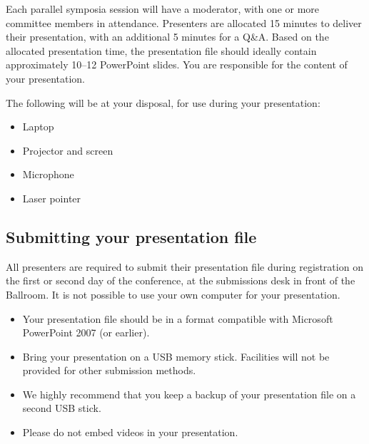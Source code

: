 \documentclass[12pt]{article}
\title{\Huge\scshape\textrmlf{Presentation guidelines}}
\author{}
\date{}
\begin{document}
\maketitle
\vspace{-5pc}
\raggedright
\thispagestyle{fancy}

Each parallel symposia session will have a moderator, with one or more committee members in attendance. Presenters are allocated 15 minutes to deliver their presentation, with an additional 5 minutes for a Q\&A. Based on the allocated presentation time, the presentation file should ideally contain approximately 10–12 PowerPoint slides. You are responsible for the content of your presentation.

The following will be at your disposal, for use during your presentation:

\begin{itemize}[itemsep=0mm,leftmargin=3.2mm]
  \item Laptop
  \item Projector and screen
  \item Microphone
  \item Laser pointer
\end{itemize}

\subsection*{Submitting your presentation file}

All presenters are required to submit their presentation file during registration on the first or second day of the conference, at the submissions desk in front of the Ballroom. It is not possible to use your own computer for your presentation.

\begin{itemize}[itemsep=0mm,leftmargin=3.2mm]
  \item Your presentation file should be in a format compatible with Microsoft PowerPoint 2007 (or earlier).
  \item Bring your presentation on a USB memory stick. Facilities will not be provided for other submission methods.
  \item We highly recommend that you keep a backup of your presentation file on a second USB stick.
  \item Please do not embed videos in your presentation.
\end{itemize}
\end{document}
